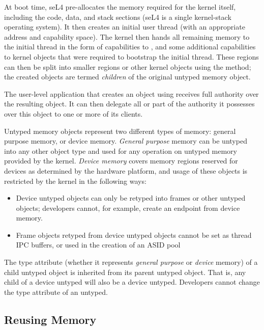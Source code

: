 At boot time, seL4 pre-allocates the memory required for the kernel
itself, including the code, data, and stack sections (seL4 is a single
kernel-stack operating system). It then creates an initial user
thread (with an appropriate address and capability space).
The kernel then hands all remaining memory to
the initial thread in the form of capabilities to , and
some additional capabilities to kernel objects that were required to
bootstrap the initial thread.  These  regions can then be split into
smaller regions or other kernel objects using the
 method; the created objects are termed \emph{children} of
the original untyped memory object.

The user-level application that creates an object using 
receives full authority over the resulting object. It can then delegate
all or part of the authority it possesses over this object to one or
more of its clients.

Untyped memory objects represent two different types of memory:
general purpose memory, or device memory.
\emph{General purpose} memory can be untyped into any other object
type and used for any operation on untyped memory provided by the kernel.
\emph{Device memory} covers memory regions reserved for devices
as determined by the hardware platform, and usage of these objects
is restricted by the kernel in the following ways:

\begin{itemize}
\item Device untyped objects can only be retyped into frames or other
untyped objects; developers cannot, for example, create an endpoint from device memory.
\item Frame objects retyped from device untyped objects cannot be set as thread IPC buffers, or used
in the creation of an ASID pool
\end{itemize}

The type attribute (whether it represents \emph{general purpose} or
\emph{device} memory) of a child untyped object is inherited from its
parent untyped object. That is, any child of a device untyped will
also be a device untyped. Developers cannot change the type attribute of an untyped.

\subsection{Reusing Memory}
\label{s:memRevoke}

